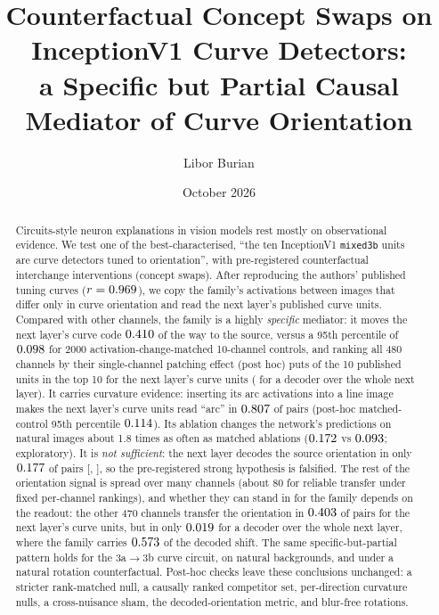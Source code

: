 \documentclass[11pt]{article}
\title{Counterfactual Concept Swaps on InceptionV1 Curve Detectors:\\ a Specific but Partial Causal Mediator of Curve Orientation}
\author{Libor Burian}
\date{October 2026}
\begin{document}
\maketitle

\begin{abstract}
Circuits-style neuron explanations in vision models rest mostly on observational evidence. We test one of the best-characterised, ``the ten InceptionV1 \texttt{mixed3b} units are curve detectors tuned to orientation'', with pre-registered counterfactual interchange interventions (concept swaps). After reproducing the authors' published tuning curves ($r=0.969$), we copy the family's activations between images that differ only in curve orientation and read the next layer's published curve units. Compared with other channels, the family is a highly \emph{specific} mediator: it moves the next layer's curve code $0.410$ of the way to the source, versus a 95th percentile of $0.098$ for 2000 activation-change-matched 10-channel controls, and ranking all 480 channels by their single-channel patching effect (post hoc) puts \AuTopOverlap{} of the 10 published units in the top 10 for the next layer's curve units (\TrRidgeOverlap{} for a decoder over the whole next layer). It carries curvature evidence: inserting its arc activations into a line image makes the next layer's curve units read ``arc'' in $0.807$ of pairs (post-hoc matched-control 95th percentile $0.114$). Its ablation changes the network's predictions on natural images about 1.8 times as often as matched ablations ($0.172$ vs $0.093$; exploratory). It is \emph{not sufficient}: the next layer decodes the source orientation in only $0.177$ of pairs [\HOneIIALo, \HOneIIAHi], so the pre-registered strong hypothesis is falsified. The rest of the orientation signal is spread over many channels (about 80 for reliable transfer under fixed per-channel rankings), and whether they can stand in for the family depends on the readout: the other 470 channels transfer the orientation in $0.403$ of pairs for the next layer's curve units, but in only $0.019$ for a decoder over the whole next layer, where the family carries $0.573$ of the decoded shift. The same specific-but-partial pattern holds for the 3a$\to$3b curve circuit, on natural backgrounds, and under a natural rotation counterfactual. Post-hoc checks leave these conclusions unchanged: a stricter rank-matched null, a causally ranked competitor set, per-direction curvature nulls, a cross-nuisance sham, the decoded-orientation metric, and blur-free rotations.
\end{abstract}
\end{document}
